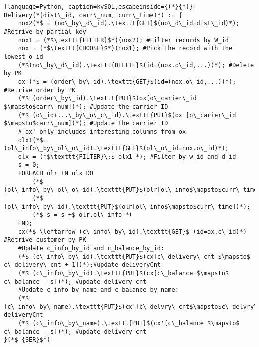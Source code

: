 \lstset{style=kvSQLstyle}
\begin{lstlisting}[language=Python, caption=kvSQL,escapeinside={(*}{*)}]
Delivery(*(dist\_id, carr\_num, curr\_time)*) := {
	nox2(*$ = (no\_by\_d\_id).\texttt{GET}$(no\_d\_id=dist\_id)*); #Retrive by partial key
	nox1 = (*$\texttt{FILTER}$*)(nox2); #Filter records by W_id 
	nox = (*$\texttt{CHOOSE}$*)(nox1); #Pick the record with the lowest o_id
	(*$(no\_by\_d\_id).\texttt{DELETE}$(id=(nox.o\_id,...))*); #Delete by PK 
	ox (*$ = (order\_by\_id).\texttt{GET}$(id=(nox.o\_id,...))*); #Retrive order by PK
	(*$ (order\_by\_id).\texttt{PUT}$(ox[o\_carier\_id $\mapsto$carr\_num])*); #Update the carrier ID
	(*$ (o\_id+...\_by\_o\_c\_id).\texttt{PUT}$(ox'[o\_carier\_id $\mapsto$carr\_num])*); #Update the carrier ID
	# ox' only includes interesting columns from ox
	olx1(*$=(ol\_info\_by\_ol\_o\_id).\texttt{GET}$(ol\_o\_id=nox.o\_id)*);
	olx = (*$\texttt{FILTER}\;$ olx1 *); #Filter by w_id and d_id 
	s = 0;
	FOREACH olr IN olx DO
		(*$ (ol\_info\_by\_ol\_o\_id).\texttt{PUT}$(olr[ol\_info$\mapsto$curr\_time])*);
		(*$ (ol\_info\_by\_id).\texttt{PUT}$(olr[ol\_info$\mapsto$curr\_time])*);
		(*$ s = s +$ olr.ol\_info *)
	END;
	cx(*$ \leftarrow (c\_info\_by\_id).\texttt{GET}$ (id=ox.c\_id)*) #Retrive customer by PK
	#Update c_info_by_id and c_balance_by_id:
	(*$ (c\_info\_by\_id).\texttt{PUT}$(cx[c\_delivery\_cnt $\mapsto$ c\_delivery\_cnt + 1])*);#update deliveryCnt
	(*$ (c\_info\_by\_id).\texttt{PUT}$(cx[c\_balance $\mapsto$ c\_balance - s])*); #update delivery cnt
	#Update c_info_by_name and c_balance_by_name:
	(*$ (c\_info\_by\_name).\texttt{PUT}$(cx'[c\_delvry\_cnt$\mapsto$c\_delvry\_cnt+1])*);#update deliveryCnt
	(*$ (c\_info\_by\_name).\texttt{PUT}$(cx'[c\_balance $\mapsto$ c\_balance - s])*); #update delivery cnt
}(*$_{SER}$*)
\end{lstlisting}


